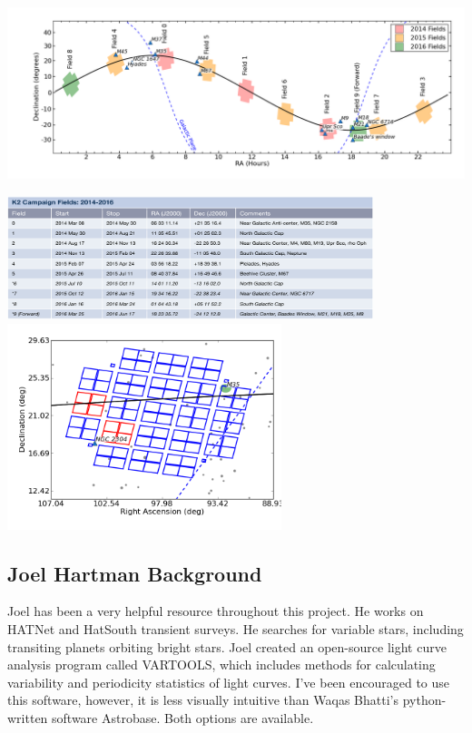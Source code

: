 \documentclass[11pt,letterpaper]{book} %
\begin{document}
\includegraphics[width=\textwidth]{KeplerCampaignSky.png}\\
\begin{center}
\includegraphics[width=0.8\textwidth]{K2table.png}\\
\includegraphics[width=0.6\textwidth]{Field0.png}\\
\end{center}

\subsection*{Joel Hartman Background}
Joel has been a very helpful resource throughout this project. He  works on HATNet and HatSouth transient surveys.
He searches for variable stars, including transiting planets orbiting bright stars. 
Joel created an open-source light curve analysis program called VARTOOLS, which includes methods for calculating variability and periodicity statistics of light curves. I've been encouraged to use this software, however, it is less visually intuitive than Waqas Bhatti's python-written software Astrobase. Both options are available.
\end{document}
